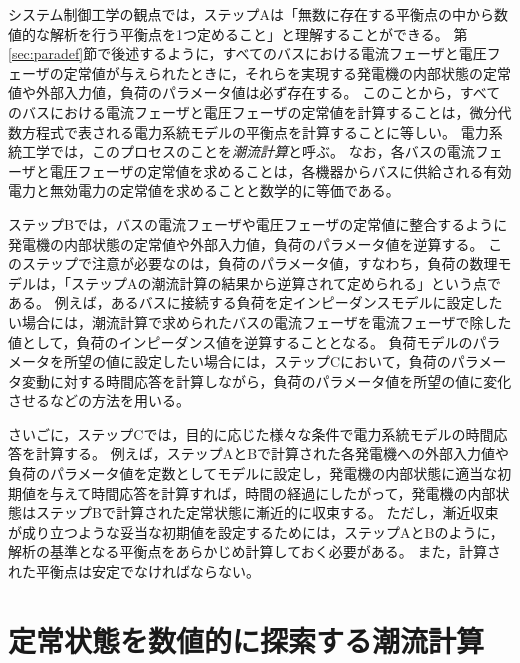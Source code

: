 \documentclass[tombow,dvipdfmx]{corona-a5}
\begin{document}
システム制御工学の観点では，ステップAは「無数に存在する平衡点の中から数値的な解析を行う平衡点を1つ定めること」と理解することができる。
第\ref{sec:paradef}節で後述するように，すべてのバスにおける電流フェーザと電圧フェーザの定常値が与えられたときに，それらを実現する発電機の内部状態の定常値や外部入力値，負荷のパラメータ値は必ず存在する。
このことから，すべてのバスにおける電流フェーザと電圧フェーザの定常値を計算することは，微分代数方程式で表される電力系統モデルの平衡点を計算することに等しい。
電力系統工学では，このプロセスのことを\emph{潮流計算}と呼ぶ。
なお，各バスの電流フェーザと電圧フェーザの定常値を求めることは，各機器からバスに供給される有効電力と無効電力の定常値を求めることと数学的に等価である。

ステップBでは，バスの電流フェーザや電圧フェーザの定常値に整合するように発電機の内部状態の定常値や外部入力値，負荷のパラメータ値を逆算する。
このステップで注意が必要なのは，負荷のパラメータ値，すなわち，負荷の数理モデルは，「ステップAの潮流計算の結果から逆算されて定められる」という点である。
例えば，あるバスに接続する負荷を定インピーダンスモデルに設定したい場合には，潮流計算で求められたバスの電流フェーザを電流フェーザで除した値として，負荷のインピーダンス値を逆算することとなる。
負荷モデルのパラメータを所望の値に設定したい場合には，ステップCにおいて，負荷のパラメータ変動に対する時間応答を計算しながら，負荷のパラメータ値を所望の値に変化させるなどの方法を用いる。


さいごに，ステップCでは，目的に応じた様々な条件で電力系統モデルの時間応答を計算する。
例えば，ステップAとBで計算された各発電機への外部入力値や負荷のパラメータ値を定数としてモデルに設定し，発電機の内部状態に適当な初期値を与えて時間応答を計算すれば，時間の経過にしたがって，発電機の内部状態はステップBで計算された定常状態に漸近的に収束する。
ただし，漸近収束が成り立つような妥当な初期値を設定するためには，ステップAとBのように，解析の基準となる平衡点をあらかじめ計算しておく必要がある。
また，計算された平衡点は安定でなければならない。




\section{定常状態を数値的に探索する潮流計算}\label{sec:powflow}
\end{document}
